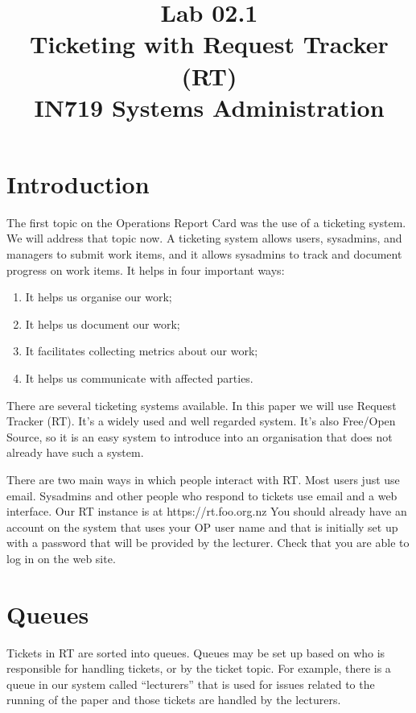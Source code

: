 \documentclass{article}
\begin{document}
\title{Lab 02.1\\Ticketing with Request Tracker (RT)\\IN719 Systems Administration}
\date{}
\maketitle

\section{Introduction}
The first topic on the Operations Report Card was the use of a ticketing system. We will address that topic now. A ticketing system allows users, sysadmins, and managers to submit work items, and it allows sysadmins to track and document progress on work items. It helps in four important ways:

\begin{enumerate}
\item It helps us organise our work;
\item It helps us document our work;
\item It facilitates collecting metrics about our work;
\item It helps us communicate with affected parties.
\end{enumerate}

There are several ticketing systems available. In this paper we will use Request Tracker (RT). It's a widely used and well regarded system. It's also Free/Open Source, so it is an easy system to introduce into an organisation that does not already have such a system.

There are two main ways in which people interact with RT. Most users just use email. Sysadmins and other people who respond to tickets use email and a web interface. Our RT instance is at https://rt.foo.org.nz You should already have an account on the system that uses your OP user name and that is initially set up with a password that will be provided by the lecturer. Check that you are able to log in on the web site.

\section{Queues}
Tickets in RT are sorted into queues. Queues may be set up based on who is responsible for handling tickets, or by the ticket topic. For example, there is a queue in our system called ``lecturers'' that is used for issues related to the running of the paper and those tickets are handled by the lecturers.
\end{document}
